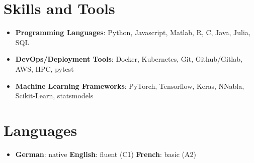 \documentclass[a4paper,11pt]{article}
\newcommand{\resumeItem}[2]{
  \item\small{
    \textbf{#1}{: #2 \vspace{-2pt}}
  }
}
\newcommand{\resumeSubItem}[2]{\resumeItem{#1}{#2}\vspace{-4pt}}
\newcommand{\resumeSubHeadingListStart}{\begin{itemize}[leftmargin=*]}
\newcommand{\resumeSubHeadingListEnd}{\end{itemize}}
\begin{document}
\section{Skills and Tools}
 \resumeSubHeadingListStart
   \resumeSubItem{Programming Languages}
     {Python, Javascript, Matlab, R, C, Java, Julia, SQL}
   \resumeSubItem{DevOps/Deployment Tools}
     {Docker, Kubernetes, Git, Github/Gitlab, AWS, HPC, pytest}
   \resumeSubItem{Machine Learning Frameworks}
     {PyTorch, Tensorflow, Keras, NNabla, Scikit-Learn, statsmodels}
     \resumeSubHeadingListEnd

\section{Languages}
\resumeSubHeadingListStart
  \item{
    \textbf{German}{: native}
    \textbf{English}{: fluent (C1)}
    \textbf{French}{: basic (A2)}
  }
\resumeSubHeadingListEnd
\end{document}
